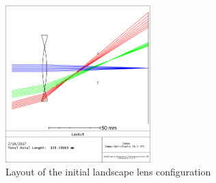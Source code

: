 \documentclass[10pt,a4paper]{article}
\begin{document}
		\begin{figure}[H]
			\centering
			\includegraphics[width=0.5\textwidth]{../zemax/1_initial/layout}
			\caption{Layout of the initial landscape lens configuration}
			\label{layout_init}
		\end{figure}		
\end{document}
